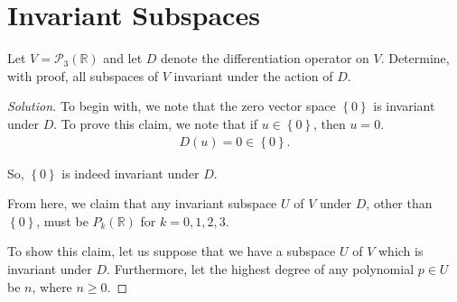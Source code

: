 \documentclass{article}
\newenvironment{solution}{\begin{proof}[Solution]}{\end{proof}}
\newcommand{\RR}{\mathbb{R}}
\DeclareMathOperator*{\vspan}{\mathrm{span}}
\begin{document}
	\section{Invariant Subspaces}
	\begin{hw}
		Let $V = \mathscr{P}_{3}(\RR)$ and let $D$ denote the differentiation operator on $V$. Determine, with proof, all subspaces of $V$ invariant under the action of $D$.
	\end{hw}
	\begin{solution}
		To begin with, we note that the zero vector space $\left\{  0\right\}$ is invariant under $D$. To prove this claim, we note that if $u \in \left\{  0 \right\}$, then $u = 0$.
		\begin{align*}
			D(u) = 0 \in \left\{  0\right\}.
		\end{align*}
	
		So, $\left\{   0\right\}$ is indeed invariant under $D$.
	
		From here, we claim that any invariant subspace $U$ of $V$ under $D$, other than $\left\{  0\right\}$, must be $P_{k}(\RR)$ for $k = 0, 1, 2, 3$. 
		
		To show this claim, let us suppose that we have a subspace $U$ of $V$ which is invariant under $D$. Furthermore, let the highest degree of any polynomial $p \in U$ be $n$, where $n \geq 0$.
		
		\begin{comment}
			We will now break this into two cases.
		
		First, consider when $n = 0$. We note then that $U$ contains some $cx^{0} = c$, which is a constant. Note then that by the maximality of $n$, we know that there can't be any polynomial whose highest degree is greater than 0. Now, we observe that for any $c \in U$, $Dc = 0$. And we know that since $U$ is a subspace, it must contain the zero vector. So, $D(U) \subseteq U$. Additionally, since $U$ is a subspace and thus is closed under scalar multiplication, then $U = \vspan\left\{  c \right\} = \vspan\left\{  1 \right\}$. However, this is in fact $\mathscr{P}_{0}(\RR)$. So, we see that $\mathscr{P}_{0}(\RR)$ is invariant under $D$. 
		\end{comment}
		
		\begin{comment}
			Now, suppose that $n > 0$. Since $n$ is the highest degree of any polynomial $p \in U$, it follows that $x^{n} \in U$. Now, suppose for the sake of contradiction that $U$ does not contain at least one of $x^{n-1}, x^{n-2}, \ldots, x^{0}$. However, we note then that this implies that there exists a degree $0 < m \leq n$ such that while $x^{m} \in U$, $x^{m-1} \not\in U$. But, if this is the case, then we observe that $D(x^{m}) = mx^{m-1}$. Thus, $D(x^{m}) \not\in U$, which is a contradiction as we claimed earlier that $U$ must be invariant under $D$.
			

\end{comment}
\end{solution}
\end{document}
